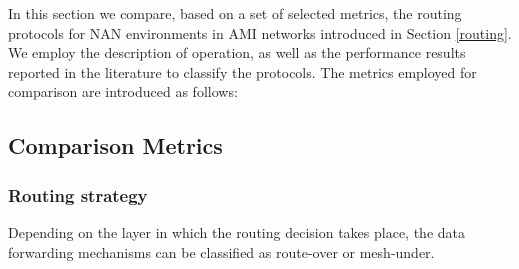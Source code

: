 \documentclass[11pt,draftclsnofoot,onecolumn]{IEEEtran}
\begin{document}
In this section we compare, based on a set of selected metrics, the routing protocols for NAN environments in AMI networks introduced in Section \ref{routing}. We employ the description of operation, as well as the performance results reported in the literature to classify the protocols. The metrics employed for comparison are introduced as follows:

\subsection{Comparison Metrics}

\subsubsection{Routing strategy}
Depending on the layer in which the routing decision takes place, the data forwarding mechanisms can be classified as route-over or mesh-under. 
\end{document}

